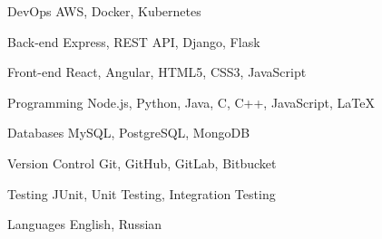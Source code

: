
\begin{cvskills}
	
	\cvskill
	{DevOps} %
	{AWS, Docker, Kubernetes} %
	
	\cvskill
	{Back-end} %
	{Express, REST API, Django, Flask} %
	
	\cvskill
	{Front-end} %
	{React, Angular, HTML5, CSS3, JavaScript} %
	
	\cvskill
	{Programming} %
	{Node.js, Python, Java, C, C++, JavaScript, LaTeX} %
	
	\cvskill
	{Databases} %
	{MySQL, PostgreSQL, MongoDB} %
	
	\cvskill
	{Version Control} %
	{Git, GitHub, GitLab, Bitbucket} %
	
	\cvskill
	{Testing} %
	{JUnit, Unit Testing, Integration Testing} %
	
	\cvskill
	{Languages} %
	{English, Russian} %
	
\end{cvskills}

